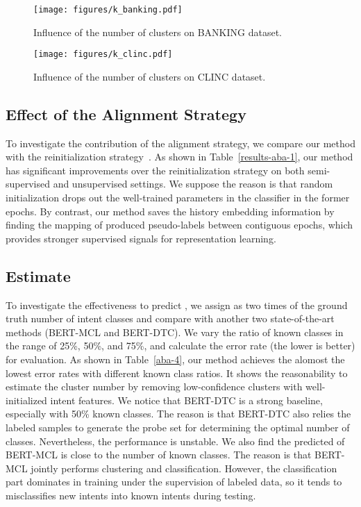 \documentclass[letterpaper]{article} \usepackage{aaai21}  \usepackage{times}  \usepackage{helvet} \usepackage{courier}  \usepackage[hyphens]{url}  \usepackage{graphicx} \urlstyle{rm} \def\UrlFont{\rm}  \usepackage{natbib}  \usepackage{caption} \frenchspacing  \setlength{\pdfpagewidth}{8.5in}  \setlength{\pdfpageheight}{11in}  \usepackage{amsmath}
\begin{document}
	\begin{figure*}[t!]
		\centering 
		\texttt{[image: figures/k\_banking.pdf]}
		\caption{\label{results-aba-3-1} Influence of the number of clusters on BANKING dataset.}
	\end{figure*}
	\begin{figure*}[t!]
		\centering  
		\texttt{[image: figures/k\_clinc.pdf]}
		\caption{\label{results-aba-3-2} Influence of the number of clusters on CLINC dataset.}
	\end{figure*}
	
	\subsection{Effect of the Alignment Strategy}
	To investigate the contribution of the alignment strategy, we compare our method with the reinitialization strategy~\cite{caron2018deep}. As shown in Table~\ref{results-aba-1}, our method has significant improvements over the reinitialization strategy on both semi-supervised and unsupervised settings. We suppose the reason is that random initialization drops out the well-trained parameters in the classifier in the former epochs. By contrast, our method saves the history embedding information by finding the mapping of produced pseudo-labels between contiguous epochs, which provides stronger supervised signals for representation learning. 
	
	\subsection{Estimate } 
	To investigate the effectiveness to predict , we assign  as two times of the ground truth number of intent classes and compare with another two state-of-the-art methods (BERT-MCL and BERT-DTC). We vary the ratio of known classes in the range of 25\%, 50\%, and  75\%, and calculate the error rate (the lower is better) for evaluation. As shown in Table~\ref{aba-4}, our method achieves the alomost the lowest error rates with different known class ratios. It shows the reasonability to estimate the cluster number by removing low-confidence clusters with well-initialized intent features. We notice that BERT-DTC is a strong baseline, especially with 50\% known classes. The reason is that BERT-DTC also relies the labeled samples to generate the probe set for determining the optimal number of classes. Nevertheless, the performance is unstable. We also find the predicted  of BERT-MCL is close to the number of known classes. The reason is that BERT-MCL jointly performs clustering and classification.  However, the classification part dominates in training under the supervision of labeled data, so it tends to misclassifies new intents into known intents during testing.
	
\end{document}
